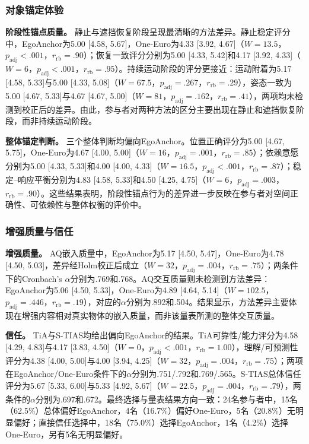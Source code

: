 \documentclass[review]{vgtc}
\begin{document}


\subsubsection{对象锚定体验}

\textbf{阶段性锚点质量。}
静止与遮挡恢复阶段呈现最清晰的方法差异。静止稳定评分中，EgoAnchor为5.00 [4.58, 5.67]，One-Euro为4.33 [3.92, 4.67]（$W=13.5$，$p_{\mathrm{adj}}<.001$，$r_{\mathrm{rb}}=.90$）；恢复一致评分分别为5.00 [4.33, 5.42]和4.17 [3.92, 4.33]（$W=6$，$p_{\mathrm{adj}}<.001$，$r_{\mathrm{rb}}=.95$）。持续运动阶段的评分更接近：运动附着为5.17 [4.58, 5.33]与5.00 [4.33, 5.08]（$W=67.5$，$p_{\mathrm{adj}}=.267$，$r_{\mathrm{rb}}=.29$），姿态一致为5.00 [4.67, 5.33]与4.67 [4.67, 5.00]（$W=81$，$p_{\mathrm{adj}}=.162$，$r_{\mathrm{rb}}=.41$），两项均未检测到校正后的差异。由此，参与者对两种方法的区分主要出现在静止和遮挡恢复阶段，而非持续运动阶段。

\textbf{整体锚定判断。}
三个整体判断均偏向EgoAnchor。位置正确评分为5.00 [4.67, 5.75]，One-Euro为4.67 [4.00, 5.00]（$W=16$，$p_{\mathrm{adj}}=.001$，$r_{\mathrm{rb}}=.85$）；依赖意愿分别为5.00 [4.33, 5.33]和4.00 [4.00, 4.33]（$W=16.5$，$p_{\mathrm{adj}}<.001$，$r_{\mathrm{rb}}=.87$）；稳定--响应平衡分别为4.83 [4.58, 5.33]和4.50 [4.25, 4.75]（$W=6$，$p_{\mathrm{adj}}=.003$，$r_{\mathrm{rb}}=.90$）。这些结果表明，阶段性锚点行为的差异进一步反映在参与者对空间正确性、可依赖性与整体权衡的评价中。

\subsubsection{增强质量与信任}

\textbf{增强质量。}
AQ嵌入质量中，EgoAnchor为5.17 [4.50, 5.47]，One-Euro为4.78 [4.50, 5.03]，差异经Holm校正后成立（$W=32$，$p_{\mathrm{adj}}=.004$，$r_{\mathrm{rb}}=.75$）；两条件下的Cronbach's $\alpha$分别为.769和.768。AQ交互质量则未检测到方法差异：EgoAnchor为5.06 [4.50, 5.33]，One-Euro为4.89 [4.64, 5.14]（$W=102.5$，$p_{\mathrm{adj}}=.446$，$r_{\mathrm{rb}}=.19$），对应的$\alpha$分别为.892和.504。结果显示，方法差异主要体现在增强内容相对真实物体的嵌入质量，而非该量表所测的整体交互质量。

\textbf{信任。}
TiA与S-TIAS均给出偏向EgoAnchor的结果。TiA可靠性/能力评分为4.58 [4.29, 4.83]与4.17 [3.83, 4.50]（$W=0$，$p_{\mathrm{adj}}<.001$，$r_{\mathrm{rb}}=1.00$），理解/可预测性评分为4.38 [4.00, 5.00]与4.00 [3.94, 4.25]（$W=32$，$p_{\mathrm{adj}}=.004$，$r_{\mathrm{rb}}=.75$）；两项在EgoAnchor/One-Euro条件下的$\alpha$分别为.751/.792和.769/.565。S-TIAS总体信任评分为5.67 [5.33, 6.00]与5.33 [4.92, 5.67]（$W=22.5$，$p_{\mathrm{adj}}=.004$，$r_{\mathrm{rb}}=.79$），两条件的$\alpha$分别为.697和.672。最终选择与量表结果方向一致：24名参与者中，15名（62.5\%）总体偏好EgoAnchor，4名（16.7\%）偏好One-Euro，5名（20.8\%）无明显偏好；直接信任选择中，18名（75.0\%）选择EgoAnchor，1名（4.2\%）选择One-Euro，另有5名无明显偏好。
\end{document}
